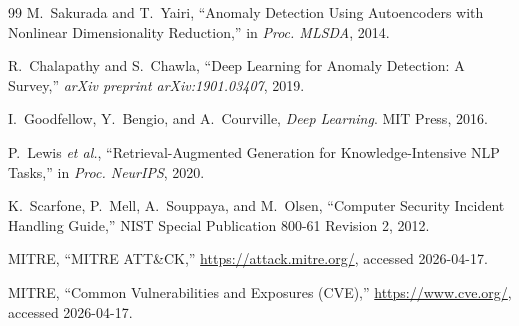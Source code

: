 \documentclass[conference]{IEEEtran}
\begin{document}
\begin{thebibliography}{99}
M.~Sakurada and T.~Yairi, ``Anomaly Detection Using Autoencoders with Nonlinear Dimensionality Reduction,'' in \emph{Proc. MLSDA}, 2014.

R.~Chalapathy and S.~Chawla, ``Deep Learning for Anomaly Detection: A Survey,'' \emph{arXiv preprint arXiv:1901.03407}, 2019.

I.~Goodfellow, Y.~Bengio, and A.~Courville, \emph{Deep Learning}. MIT Press, 2016.

P.~Lewis \emph{et al.}, ``Retrieval-Augmented Generation for Knowledge-Intensive NLP Tasks,'' in \emph{Proc. NeurIPS}, 2020.

K.~Scarfone, P.~Mell, A.~Souppaya, and M.~Olsen, ``Computer Security Incident Handling Guide,'' NIST Special Publication 800-61 Revision 2, 2012.

MITRE, ``MITRE ATT\&CK,'' \url{https://attack.mitre.org/}, accessed 2026-04-17.

MITRE, ``Common Vulnerabilities and Exposures (CVE),'' \url{https://www.cve.org/}, accessed 2026-04-17.

\end{thebibliography}

% 
\end{document}
